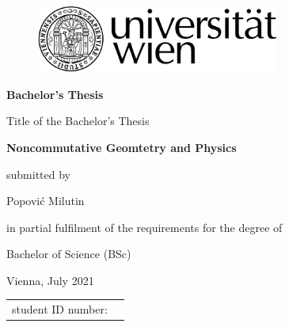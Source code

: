 \begin{titlepage}

\begin{center}
\begin{figure}
\hspace{8.8cm}
\includegraphics[width=8cm]{pics/uni_logo}
\end{figure}
\vspace*{2cm}

    \fontsize{22}{0} \selectfont \textbf{Bachelor's Thesis}\\

\vspace*{2.5cm}

\fontsize{12}{0} \selectfont Title of the Bachelor's Thesis\\

\vspace*{0.4cm}

\fontsize{18}{0} \selectfont \textbf{Noncommutative Geomtetry and Physics}\\

\vspace*{1.5cm}

    {\fontsize{12}{0} \selectfont submitted by}\\
\vspace*{0.3cm}

    { \fontsize{14}{0} \selectfont Popović Milutin}\\

\vspace*{2cm}

    {\fontsize{12}{0} \selectfont  in partial fulfilment of the requirements for the degree of}\\
\vspace*{0.4cm}

    { \fontsize{14}{0} \selectfont Bachelor of Science (BSc)}\\
\vspace*{2cm}

    { \fontsize{10}{0} \selectfont Vienna, July 2021}\\

\vspace*{3.4cm}

\begin{tabular}{p{9cm}p{11.25cm}}
        \fontsize{10}{0} \selectfont
        student ID number:\vspace*{0.3cm}& \fontsize{10}{0} \selectfont 11807930\\


\end{tabular}
\end{center}
\end{titlepage}

